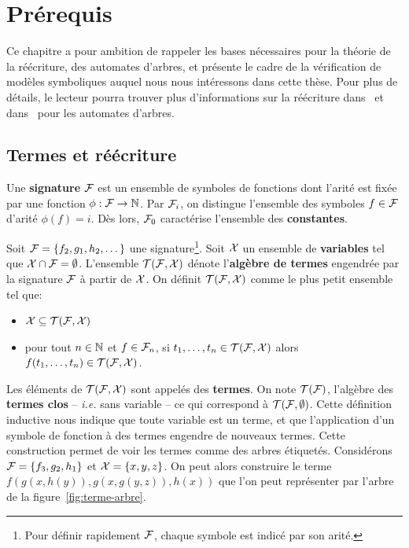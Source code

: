 \chapter{Prérequis}
\label{chap:preliminaires}

Ce chapitre a pour ambition de rappeler les bases nécessaires pour la théorie de la réécriture,
des automates d'arbres, et présente le cadre de la vérification de modèles symboliques auquel
nous nous intéressons dans cette thèse. Pour plus de détails, le lecteur pourra trouver plus d'informations
sur la réécriture dans~\cite{BaaderN-book98} et dans~\cite{TATA} pour les automates d'arbres.


\section{Termes et réécriture}

\begin{definition}
  Une \textbf{signature} $\mathcal{F}$ est un ensemble de symboles de fonctions dont l'arité est fixée par
  une fonction $\phi : \mathcal{F} \rightarrow \mathbb{N}$. Par $\mathcal{F}_i$, on distingue l'ensemble des symboles $ f \in \mathcal{F}$
  d'arité $\phi(f) = i$. Dès lors, $\mathcal{F}_0$ caractérise l'ensemble des \textbf{constantes}.
\end{definition}


\begin{definition}
  Soit $\mathcal{F} = \{ f_2, g_1, h_2, \dots\}$ une signature\footnote{\footnotesize Pour définir rapidement $\mathcal{F}$, chaque symbole est indicé par son arité.}.
  Soit $\mathcal X$ un ensemble de \textbf{variables} tel que $\mathcal X \cap \mathcal{F} = \emptyset$.
  L'ensemble $\mathcal{T(F, X)}$ dénote l'\textbf{algèbre de termes} engendrée par la signature $\mathcal{F}$ à partir de $\mathcal X$. On définit $\mathcal{T(F, X)}$ comme le plus petit ensemble
  tel que:
  \begin{itemize}
  \item $\mathcal X \subseteq \mathcal{T(F, X)}$ 
  \item pour tout $n \in \mathbb{N}$ et $f \in \mathcal{F}_n$, si $t_1, \dots, t_n \in \mathcal{T(F, X)}$ alors $f(t_1, \dots, t_n) \in \mathcal{T(F, X)}$.
  \end{itemize}
\end{definition}
Les éléments de $\mathcal{T(F, X)}$ sont appelés des \textbf{termes}. On note $\mathcal{T(F)}$, l'algèbre des \textbf{termes clos} -- \textit{i.e.} 
sans variable -- ce qui correspond à $\mathcal T(\mathcal{F},\emptyset)$. %
Cette définition inductive nous indique que toute variable est un terme, 
et que l'application d'un symbole de fonction à des termes engendre de nouveaux termes. Cette construction permet de voir
les termes comme des arbres étiquetés.
Considérons $\mathcal{F} = \{ f_3, g_2, h_1 \}$ et $\mathcal X = \{x, y, z\}$. On peut alors construire le terme $f(g(x,h(y)), g(x, g(y, z)), h(x))$
que l'on peut représenter par l'arbre de la figure~\ref{fig:terme-arbre}.


